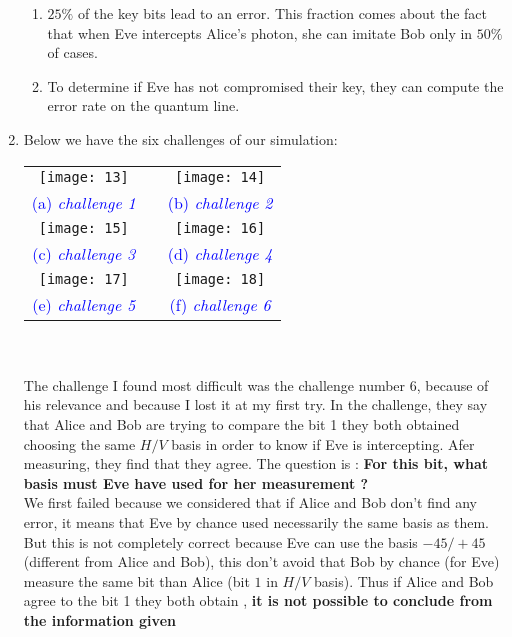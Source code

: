 \documentclass[a4paper,12pt]{article}
\newcommand{\tbl}[1]{\textcolor{blue}{#1}}
\newcommand{\bfs}[1]{\textbf{#1}}
\begin{document}
\begin{enumerate}
\begin{enumerate}
	\item $25\%$ of the key bits lead to an error. This fraction comes about the fact that when Eve intercepts Alice's photon, she can imitate Bob only in $50\%$ of cases.
	\item To determine if Eve has not compromised their key, they can compute the error rate on the quantum line.
\end{enumerate}
	\item Below we have the six challenges of our simulation:\\
	
		\hspace{-2.5cm}\begin{tabular}{ccc}
		\texttt{[image: 13]} & & \texttt{[image: 14]}\\
		\tbl{(a) \emph{ challenge 1 }} & & \tbl{(b) \emph{ challenge 2}}\\
		\texttt{[image: 15]}  && \texttt{[image: 16]}\\
		\tbl{(c) \emph{challenge 3}} && \tbl{(d) \emph{challenge 4}}\\
		\texttt{[image: 17]}  && \texttt{[image: 18]}\\
		\tbl{(e) \emph{challenge 5 }} && \tbl{(f) \emph{challenge 6}}\\
	\end{tabular}\\ \\[8mm]
	The challenge I found most difficult was the challenge number $6$, because of his relevance and because I lost it at my first try. In the challenge, they say that Alice and Bob are trying to compare the bit 1 they both obtained choosing the same $H/V$ basis in order to know if Eve is intercepting. Afer measuring, they find that they agree. The question is : \bfs{For this bit, what basis must Eve have used for her measurement ?}\\
	We first failed because we considered that if Alice and Bob don't find any error, it means that Eve by chance used necessarily the same basis as them. But this is not completely correct because Eve can use the basis $-45/+45$ (different from Alice and Bob), this don't avoid that Bob by chance (for Eve) measure the same bit than Alice (bit $1$ in $H/V$ basis). Thus if Alice and Bob agree to the bit 1 they both obtain , \bfs{it is not possible to conclude from the information given}
\end{enumerate}
\end{document}
